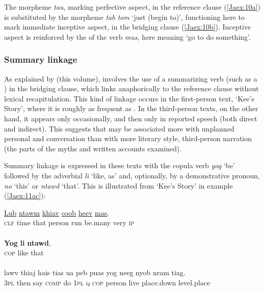 \documentclass[output=paper]{LSP/langsci}
\begin{document}
\noindent
The morpheme \textit{tau}, marking perfective aspect, in the reference clause (\ref{Jaex:10a}) is substituted by the morpheme \textit{tab tom} `just (begin to)', functioning here to mark immediate inceptive aspect, in the bridging clause (\ref{Jaex:10b}). Inceptive aspect is reinforced by the  of the verb \textit{mus}, here meaning `go to do something'.
 
\subsubsection{Summary linkage}
\label{JaSummar}
As explained by \citeauthor{guerin18} (this volume),  involves the use of a summarizing verb (such as a ) in the bridging clause, which links anaphorically to the reference clause without lexical recapitulation. This kind of linkage occurs in the first-person text, `Kee’s Story', where it is roughly as frequent as . In the third-person texts, on the other hand, it appears only occasionally, and then only in reported speech (both direct and indirect). This suggests that  may be associated more with unplanned personal  and conversation than with more literary style, third-person narration (the  parts of the myths and written accounts examined).
 
Summary linkage is expressed in these texts with the copula verb \textit{yog} `be' followed by the adverbial \textit{li} `like, as' and, optionally, by a demonstrative pronoun, \textit{no} `this' or \textit{ntawd} `that'. This is illustrated from `Kee’s Story' in example (\ref{Jaex:11ac}):
 
\begin{exe}
\ex \label{Jaex:11ac}
\begin{xlist}
\ex \label{Jaex:11a}
\gll \underline{Lub} \underline{} \underline{ntawm} \underline{} \underline{khiav} \underline{coob}     \underline{heev} \underline{mas}.        \\
\textsc{clf} time that person run be.many very \textsc{ip}\\
\glt {}\\
\ex \label{Jaex:11b}
\gll   \textbf{Yog} \textbf{li} \textbf{ntawd},\\
\textsc{cop} like that\\
\glt {}\\
\ex \label{Jaex:11c}
\gll lawv  thiaj hais tias ua  peb puas yog neeg nyob nram   tiag.\\     	      
     \textsc{3pl} then say \textsc{comp} do \textsc{1pl} \textsc{q} \textsc{cop} person live place.down level.place\\
\glt {} \citep[][227]{fuller85}
\end{xlist}
\end{exe}
\end{document}
